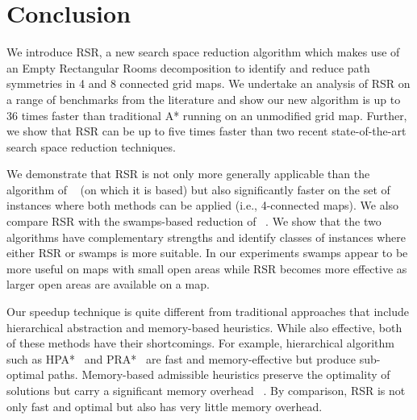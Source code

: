 \section{Conclusion}
We introduce RSR, a new search space reduction algorithm
which makes use of an Empty Rectangular Rooms decomposition
to identify and reduce path symmetries in 4 and 8 connected
grid maps.
We undertake an analysis of RSR on a range of benchmarks from the
literature and show our new algorithm is up to 36 times faster than
traditional A* running on an unmodified grid map.
Further, we show that RSR can be up to five times faster than two recent
state-of-the-art search space reduction techniques.
\par
We demonstrate that RSR is not only more generally applicable
than the algorithm of \citeauthor{harabor10}~ 
(on which it is based) but also significantly faster on the set of 
instances where both methods can be applied (i.e., 4-connected maps).
We also compare RSR with the swamps-based reduction
of \citeauthor{pochter10}~.
We show that the two algorithms have complementary strengths and identify 
classes of instances where either RSR or swamps is more suitable.
In our experiments swamps appear to be more useful on maps with small open areas
while RSR becomes more effective as larger open areas are available on a map.
\par
Our speedup technique is quite different from traditional approaches 
that include hierarchical abstraction and memory-based heuristics.
While also effective, both of these methods have their shortcomings.
For example, hierarchical algorithm such as HPA*~\cite{botea04} and 
PRA*~\cite{sturtevant05} are fast and memory-effective but produce 
sub-optimal paths.
Memory-based admissible heuristics preserve the optimality of 
solutions but carry a significant memory overhead~
\cite{sturtevant09,goldberg05,Cazenave:06,bjornsson06}.
By comparison, RSR is not only fast and optimal but also has very little
memory overhead.



